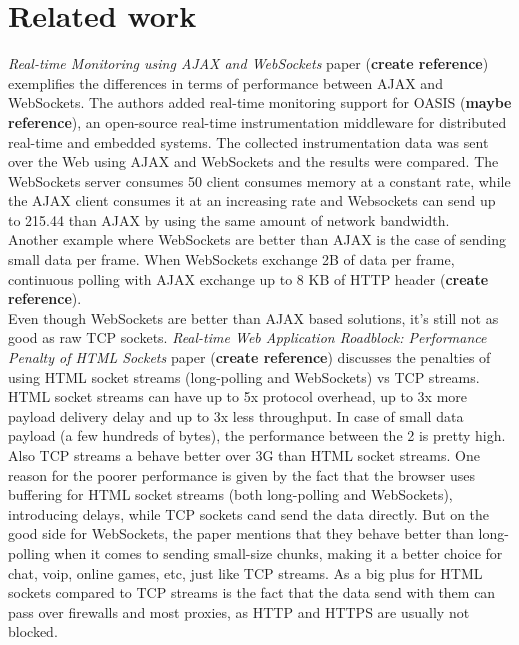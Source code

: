 \documentclass[conference]{IEEEtran}
\begin{document}
\section{Related work}
\textit{Real-time Monitoring using AJAX and WebSockets} paper (\textbf{create reference})
exemplifies the differences in terms of performance between AJAX and WebSockets.
The authors added real-time monitoring support for OASIS (\textbf{maybe reference}),
an open-source real-time instrumentation middleware for distributed real-time
and embedded systems. The collected instrumentation data was sent over the Web
using AJAX and WebSockets and the results were compared. The WebSockets server
consumes 50%
client consumes memory at a constant rate, while the AJAX client consumes it
at an increasing rate and Websockets can send up to 215.44%
than AJAX by using the same amount of network bandwidth.
\\
\indent
Another example where WebSockets are better than AJAX is the case of sending
small data per frame. When WebSockets exchange 2B of data per frame, continuous
polling with AJAX exchange up to 8 KB of HTTP header (\textbf{create reference}).
\\
\indent
Even though WebSockets are better than AJAX based solutions, it's still not as
good as raw TCP sockets. \textit{Real-time Web Application Roadblock:
Performance Penalty of HTML Sockets} paper (\textbf{create reference}) discusses
the penalties of using HTML socket streams (long-polling and WebSockets)
vs TCP streams. HTML socket streams can have up to 5x protocol overhead, up to
3x more payload delivery delay and up to 3x less throughput. In case of small
data payload (a few hundreds of bytes), the performance between the 2 is
pretty high. Also TCP streams a behave better over 3G than HTML socket streams.
One reason for the poorer performance is given by the fact that the browser uses
buffering for HTML socket streams (both long-polling and WebSockets), introducing
delays, while TCP sockets cand send the data directly. But on the good side for
WebSockets, the paper mentions that they behave better than long-polling when
it comes to sending small-size chunks, making it a better choice for chat,
voip, online games, etc, just like TCP streams. As a big plus for HTML sockets
compared to TCP streams is the fact that the data send with them can pass over
firewalls and most proxies, as HTTP and HTTPS are usually not blocked.

{}

\end{document}
